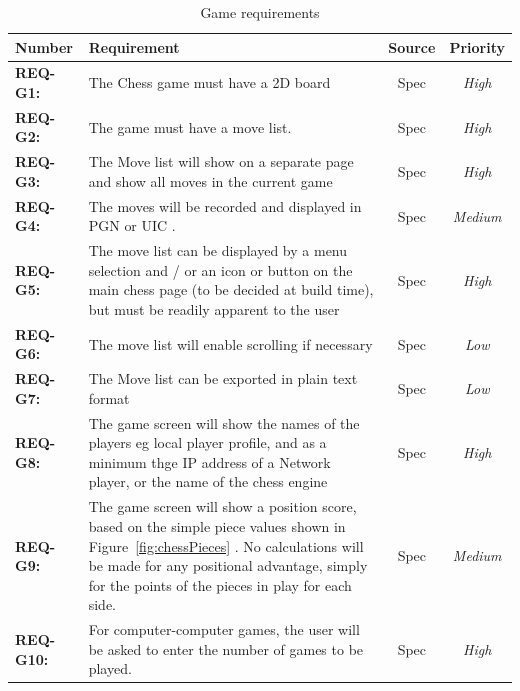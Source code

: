 \documentclass[a4paper,10pt]{article}
\begin{document}
\begin{table}[H]
\caption{Game requirements}
\label{table:gameReqs}
\begin{tabular}{|| l | p{10.5cm}  |  c  | c ||} \hline  
\textbf{Number} & \textbf{Requirement} & \textbf{Source} & \textbf{Priority}\\ \hline
\textbf{REQ-G1:}  & The Chess game must have a 2D board  & Spec & \textit{ High} \\

\textbf{REQ-G2:} 
&  The game must have a move list.
& Spec  &  \textit{High}\\

\textbf{REQ-G3:} 
&  The Move list will show on a separate page and show all moves in the current game
& Spec  &  \textit{High}\\

\textbf{REQ-G4:} 
& The moves will be recorded and displayed in PGN \cite{PGN-94} or UIC \cite{UCIInterface}.
& Spec  &  \textit{Medium}\\

\textbf{REQ-G5:} 
& The move list can be displayed by a menu selection and / or an icon or button on the main chess page (to be decided at build time), but must be readily apparent to the user
& Spec  &  \textit{High}\\

\textbf{REQ-G6:} 
& The move list will enable scrolling if necessary
& Spec  &  \textit{Low}\\

\textbf{REQ-G7:} 
& The Move list can be exported in plain text format
& Spec  &  \textit{Low}\\

\textbf{REQ-G8:} 
& The game screen will show the names of the players eg local player profile, and as a minimum thge IP address of a Network player, or the name of the chess engine
& Spec  &  \textit{High}\\

\textbf{REQ-G9:} 
& The game screen will show a position score, based on the simple piece values shown in Figure~\ref{fig:chessPieces} . No calculations will be made for any positional advantage, simply for the points of the pieces in play for each side.
& Spec  &  \textit{Medium}\\

\textbf{REQ-G10:} 
& For computer-computer games, the user will be asked to enter the number of games to be played.
& Spec  &  \textit{High}\\


\end{tabular}
\end{table}
\end{document}
